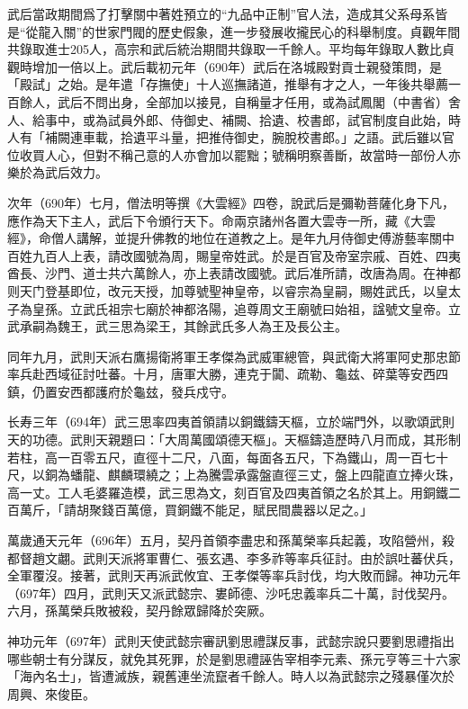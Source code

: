 武后當政期間爲了打擊關中著姓預立的“九品中正制”官人法，造成其父系母系皆是“從龍入關”的世家門閥的歷史假象，進一步發展收攏民心的科舉制度。貞觀年間共錄取進士205人，高宗和武后統治期間共錄取一千餘人。平均每年錄取人數比貞觀時增加一倍以上。武后載初元年（690年）武后在洛城殿對貢士親發策問，是「殿試」之始。是年遣「存撫使」十人巡撫諸道，推舉有才之人，一年後共舉薦一百餘人，武后不問出身，全部加以接見，自稱量才任用，或為試鳳閣（中書省）舍人、給事中，或為試員外郎、侍御史、補闕、拾遺、校書郎，試官制度自此始，時人有「補闕連車載，拾遺平斗量，把推侍御史，腕脫校書郎。」之語。武后雖以官位收買人心，但對不稱己意的人亦會加以罷黜；號稱明察善斷，故當時一部份人亦樂於為武后效力。

次年（690年）七月，僧法明等撰《大雲經》四卷，說武后是彌勒菩薩化身下凡，應作為天下主人，武后下令頒行天下。命兩京諸州各置大雲寺一所，藏《大雲經》，命僧人講解，並提升佛教的地位在道教之上。是年九月侍御史傅游藝率關中百姓九百人上表，請改國號為周，賜皇帝姓武。於是百官及帝室宗戚、百姓、四夷酋長、沙門、道士共六萬餘人，亦上表請改國號。武后准所請，改唐為周。在神都则天门登基即位，改元天授，加尊號聖神皇帝，以睿宗為皇嗣，賜姓武氏，以皇太子為皇孫。立武氏祖宗七廟於神都洛陽，追尊周文王廟號曰始祖，諡號文皇帝。立武承嗣為魏王，武三思為梁王，其餘武氏多人為王及長公主。

同年九月，武則天派右鷹揚衛將軍王孝傑為武威軍總管，與武衛大將軍阿史那忠節率兵赴西域征討吐蕃。十月，唐軍大勝，連克于闐、疏勒、龜兹、碎葉等安西四鎮，仍置安西都護府於龜玆，發兵戍守。

长寿三年（694年）武三思率四夷首領請以銅鐵鑄天樞，立於端門外，以歌頌武則天的功德。武則天親題曰：「大周萬國頌德天樞」。天樞鑄造歷時八月而成，其形制若柱，高一百零五尺，直徑十二尺，八面，每面各五尺，下為鐵山，周一百七十尺，以銅為蟠龍、麒麟環繞之；上為騰雲承露盤直徑三丈，盤上四龍直立捧火珠，高一丈。工人毛婆羅造模，武三思為文，刻百官及四夷首領之名於其上。用銅鐵二百萬斤，「請胡聚錢百萬億，買銅鐵不能足，賦民間農器以足之。」

萬歲通天元年（696年）五月，契丹首領李盡忠和孫萬榮率兵起義，攻陷營州，殺都督趙文翽。武則天派將軍曹仁、張玄遇、李多祚等率兵征討。由於誤吐蕃伏兵，全軍覆沒。接著，武則天再派武攸宜、王孝傑等率兵討伐，均大敗而歸。神功元年（697年）四月，武則天又派武懿宗、婁師德、沙吒忠義率兵二十萬，討伐契丹。六月，孫萬榮兵敗被殺，契丹餘眾歸降於突厥。

神功元年（697年）武則天使武懿宗審訊劉思禮謀反事，武懿宗說只要劉思禮指出哪些朝士有分謀反，就免其死罪，於是劉思禮誣告宰相李元素、孫元亨等三十六家「海內名士」，皆遭滅族，親舊連坐流竄者千餘人。時人以為武懿宗之殘暴僅次於周興、來俊臣。

